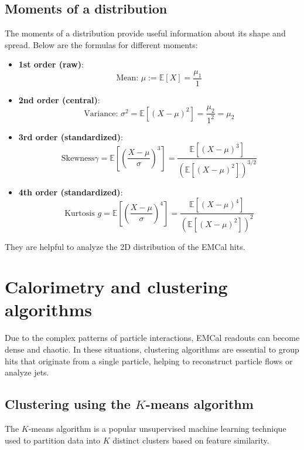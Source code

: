 \documentclass[a4paper,12pt]{article}
\begin{document}
\subsection{Moments of a distribution}

The moments of a distribution provide useful information about its shape and spread. Below are the formulas for different moments:

\begin{itemize}
    \item \textbf{1st order (raw)}: 
    \[
    \text{Mean: } \mu := \mathbb{E}[X] = \frac{\mu_1}{1}
    \]
    \item \textbf{2nd order (central)}: 
    \[
    \text{Variance: } \sigma^2 = \mathbb{E}[(X - \mu)^2] = \frac{\mu_2}{1^2} = \mu_2
    \]
    \item \textbf{3rd order (standardized)}: 
    \[
    \text{Skewness}\gamma = \mathbb{E} \left[ \left( \frac{X - \mu}{\sigma} \right)^3 \right] = \frac{\mathbb{E}[(X - \mu)^3]}{(\mathbb{E}[(X - \mu)^2])^{3/2}}
    \]
    \item \textbf{4th order (standardized)}: 
    \[
    \text{Kurtosis } g = \mathbb{E} \left[ \left( \frac{X - \mu}{\sigma} \right)^4 \right] = \frac{\mathbb{E}[(X - \mu)^4]}{(\mathbb{E}[(X - \mu)^2])^2}
    \]
\end{itemize}

They are helpful to analyze the 2D distribution of the EMCal hits.

\section{Calorimetry and clustering algorithms}

Due to the complex patterns of particle interactions, EMCal readouts can become dense and chaotic.
In these situations, clustering algorithms are essential to group hits that originate from a single particle, helping to reconstruct particle flows or analyze jets.

\subsection{Clustering using the $K$-means algorithm}

The $K$-means algorithm is a popular unsupervised machine learning technique used to partition data into $K$ distinct clusters based on feature similarity. 
\end{document}
